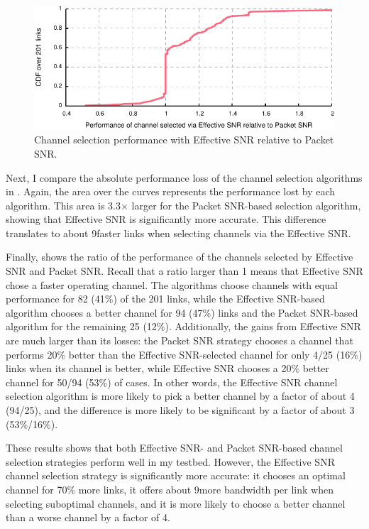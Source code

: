 \begin{figure}[p]
	\centering
	\includegraphics[width=\textwidth]{figures/applications/chan_sel_ratio.pdf}
	\caption[Channel selection algorithm performance with Effective SNR relative to Packet SNR]{\label{fig:chan_sel_ratio}Channel selection performance with Effective SNR relative to Packet SNR.}
\end{figure}

Next, I compare the absolute performance loss of the channel selection algorithms in . Again, the area over the curves represents the performance lost by each algorithm. This area is 3.3$\times$ larger for the Packet SNR-based selection algorithm, showing that Effective SNR is significantly more accurate. This difference translates to about 9\Mbps faster links when selecting channels via the Effective SNR.

Finally,  shows the ratio of the performance of the channels selected by Effective SNR and Packet SNR. Recall that a ratio larger than 1 means that Effective SNR chose a faster operating channel. The algorithms choose channels with equal performance for 82 (41\%) of the 201 links, while the Effective SNR-based algorithm chooses a better channel for 94 (47\%) links and the Packet SNR-based algorithm for the remaining 25 (12\%). Additionally, the gains from Effective SNR are much larger than its losses: the Packet SNR strategy chooses a channel that performs 20\% better than the Effective SNR-selected channel for only 4/25 (16\%) links when its channel is better, while Effective SNR chooses a 20\% better channel for 50/94 (53\%) of cases. In other words, the Effective SNR channel selection algorithm is more likely to pick a better channel by a factor of about 4 (94/25), and the difference is more likely to be significant by a factor of about 3 (53\%/16\%).

These results shows that both Effective SNR- and Packet SNR-based channel selection strategies perform well in my testbed. However, the Effective SNR channel selection strategy is significantly more accurate: it chooses an optimal channel for 70\% more links, it offers about 9\Mbps more bandwidth per link when selecting suboptimal channels, and it is more likely to choose a better channel than a worse channel by a factor of 4.

